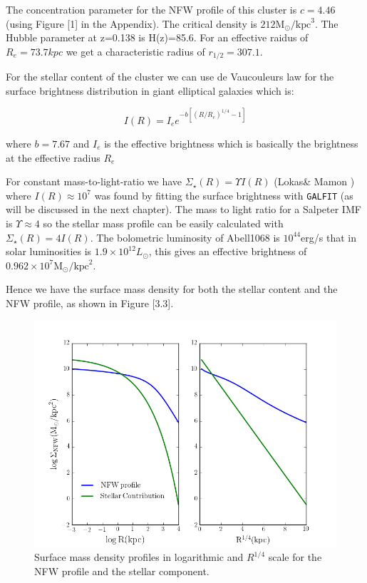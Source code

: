 The concentration parameter for the NFW profile of this cluster is $c=4.46$ (using Figure [1] in the Appendix). The critical density is $212 \text{M}_{\odot}/\text{kpc}^{3}$. The Hubble parameter at z=0.138 is H(z)=85.6. For an effective raidus of $R_{e}=73.7 kpc$ we get a characteristic radius of $r_{1/2}=307.1$.

For the stellar content of the cluster we can use de Vaucouleurs law for the surface brightness distribution in giant elliptical galaxies which is:

\begin{equation}
I(R)=I_{e}e^{-b\left[\left(R/R_{e}\right)^{1/4}-1\right]}
\end{equation}

where $b=7.67$ and $I_{e}$ is the effective brightness which is basically the brightness at the effective radius $R_{e}$

For constant mass-to-light-ratio we have $\Sigma_{\star}(R)= \Upsilon I(R)$ (Lokas\& Mamon \citeyear{Reference14}) where  $I(R)\approx 10^{7}$ was found by fitting the surface brightness with \texttt{GALFIT} (as will be discussed in the next chapter). The mass to light ratio for a Salpeter IMF is $\Upsilon\approx 4$ so the stellar mass profile can be easily calculated with  $\Sigma_{\star}(R)= 4I(R)$. The bolometric luminosity of Abell1068 is $10^{44}$erg/s that in solar luminosities is $1.9\times 10^{12} L_{\odot}$, this gives an effective brightness of $0.962\times 10^{7}\text{M}_{\odot}/\text{kpc}^2$. 

Hence we have the surface mass density for both the stellar content and the NFW profile, as shown in Figure [3.3].

\begin{figure}[H]
\centering
\includegraphics[width=12cm]{images/Surface_mass_density_log.png}
\caption[Surface mass density profiles]{Surface mass density profiles in logarithmic and $R^{1/4}$ scale for the NFW profile and the stellar component.}
\end{figure}

